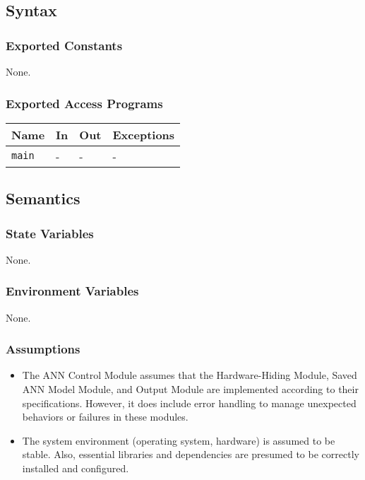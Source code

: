 \documentclass[12pt, titlepage]{article}
\def\code#1{\texttt{#1}}
\begin{document}
\subsection{Syntax}

\subsubsection{Exported Constants}
None.

\subsubsection{Exported Access Programs}

\begin{center}
\begin{tabular}{p{2cm} p{4cm} p{4cm} p{2cm}}
\hline
\textbf{Name} & \textbf{In} & \textbf{Out} & \textbf{Exceptions} \\
\hline
\code{main} & - & - & - \\
\hline
\end{tabular}
\end{center}

\subsection{Semantics}

\subsubsection{State Variables}
None.

\subsubsection{Environment Variables}
None.


\subsubsection{Assumptions}
\begin{itemize}
  \item The ANN Control Module assumes that the Hardware-Hiding Module, Saved ANN Model Module, and Output Module are implemented 
  according to their specifications. However, it does include error handling to manage unexpected behaviors or failures in these modules.
  \item The system environment (operating system, hardware) is assumed to be stable. 
  Also, essential libraries and dependencies are presumed to be correctly installed and configured.
\end{itemize}
\end{document}
